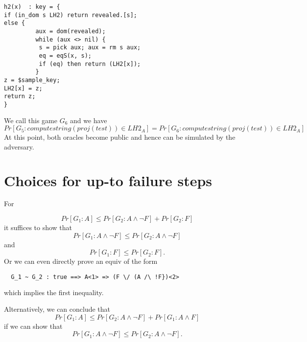 \documentclass[]{article}
\begin{document}
\begin{verbatim}
h2(x)  : key = {
if (in_dom s LH2) return revealed.[s];
else {
         aux = dom(revealed);	
         while (aux <> nil) {
          s = pick aux; aux = rm s aux;
          eq = eqS(x, s);
          if (eq) then return (LH2[x]);
         }
z = $sample_key;
LH2[x] = z;
return z; 	
} 
\end{verbatim}
We call this game $G_6$ and we have
\[
Pr[G_5 : computestring(proj(test)) \in LH2_A ] = 
Pr[G_6 : computestring(proj(test)) \in LH2_A ]
\]
At this point, both oracles become public and hence can be simulated by the adversary.

\section{Choices for up-to failure steps}

For

\[
  Pr[G_1 : A] \leq Pr[G_2 : A \land \neg F] + Pr[G_2 : F]
\]
%
it suffices to show that
\[
  Pr[G_1 : A \land \neg F] \leq Pr[G_2 : A \land \neg F]
\]
and
 \[
   Pr[G_1 : F] \leq Pr[G_2 : F].
 \]
%
Or we can even directly prove an equiv of the form
\begin{verbatim}
  G_1 ~ G_2 : true ==> A<1> => (F \/ (A /\ !F})<2>
\end{verbatim}
which implies the first inequality.

Alternatively, we can conclude that
\[
  Pr[G_1 : A] \leq Pr[G_2 : A \land \neg F] + Pr[G_1 : A \land F]
\]
%
if we can show that
\[
  Pr[G_1 : A \land \neg F] \leq Pr[G_2 : A \land \neg F].
\]
\end{document}
